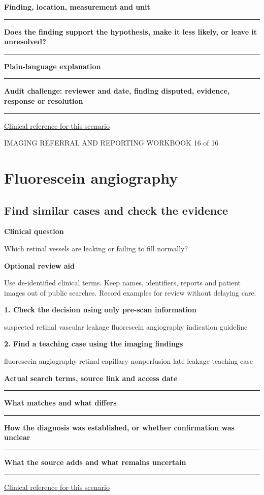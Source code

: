 \documentclass[11pt,a4paper]{article}
\newcommand{\record}[1]{\textbf{#1}\par\vspace{0.55\baselineskip}\hrule\vspace{0.35\baselineskip}}
\begin{document}
\record{Finding, location, measurement and unit}

\record{Does the finding support the hypothesis, make it less likely, or leave it unresolved?}

\record{Plain-language explanation}

\record{Audit challenge: reviewer and date, finding disputed, evidence, response or resolution}

\small\href{https://www.aaojournal.org/article/S0161-6420(19)32902-5/fulltext/}{Clinical reference for this scenario}

\normalsize

\newpage

{\small IMAGING REFERRAL AND REPORTING WORKBOOK \hfill 16 of 16}

\section*{Fluorescein angiography}

\subsection*{Find similar cases and check the evidence}

\textbf{Clinical question}\par Which retinal vessels are leaking or failing to fill normally?\par

\textbf{Optional review aid}\par Use de-identified clinical terms. Keep names, identifiers, reports and patient images out of public searches. Record examples for review without delaying care.\par

\textbf{1. Check the decision using only pre-scan information}\par suspected retinal vascular leakage fluorescein angiography indication guideline\par

\textbf{2. Find a teaching case using the imaging findings}\par fluorescein angiography retinal capillary nonperfusion late leakage teaching case\par

\record{Actual search terms, source link and access date}

\record{What matches and what differs}

\record{How the diagnosis was established, or whether confirmation was unclear}

\record{What the source adds and what remains uncertain}

\small\href{https://www.aaojournal.org/article/S0161-6420(19)32902-5/fulltext/}{Clinical reference for this scenario}

\normalsize
\end{document}
